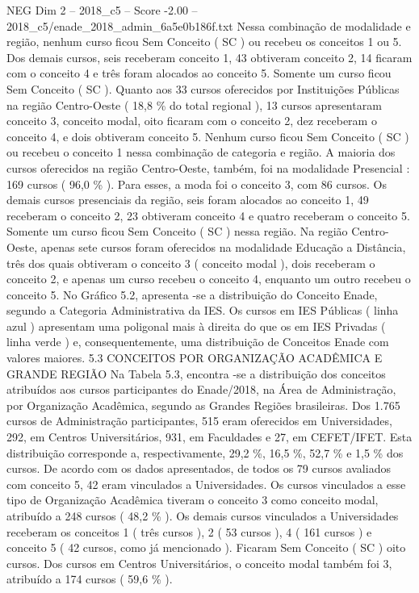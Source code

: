 \begin{textsample}{NEG Dim 2 – 2018\_c5 – Score -2.00 – 2018\_c5/enade\_2018\_admin\_6a5e0b186f.txt}
Nessa combinação de modalidade e região, nenhum curso ficou Sem Conceito ( SC ) ou recebeu os conceitos 1 ou 5.
Dos demais cursos, seis receberam conceito 1, 43 obtiveram conceito 2, 14 ficaram com o conceito 4 e três foram alocados ao conceito 5.
Somente um curso ficou Sem Conceito ( SC ).
Quanto aos 33 cursos oferecidos por Instituições Públicas na região Centro-Oeste ( 18,8 \% do total regional ), 13 cursos apresentaram conceito 3, conceito modal, oito ficaram com o conceito 2, dez receberam o conceito 4, e dois obtiveram conceito 5.
Nenhum curso ficou Sem Conceito ( SC ) ou recebeu o conceito 1 nessa combinação de categoria e região.
A maioria dos cursos oferecidos na região Centro-Oeste, também, foi na modalidade Presencial : 169 cursos ( 96,0 \% ).
Para esses, a moda foi o conceito 3, com 86 cursos.
Os demais cursos presenciais da região, seis foram alocados ao conceito 1, 49 receberam o conceito 2, 23 obtiveram conceito 4 e quatro receberam o conceito 5.
Somente um curso ficou Sem Conceito ( SC ) nessa região.
Na região Centro-Oeste, apenas sete cursos foram oferecidos na modalidade Educação a Distância, três dos quais obtiveram o conceito 3 ( conceito modal ), dois receberam o conceito 2, e apenas um curso recebeu o conceito 4, enquanto um outro recebeu o conceito 5.
No Gráfico 5.2, apresenta -se a distribuição do Conceito Enade, segundo a Categoria Administrativa da IES.
Os cursos em IES Públicas ( linha azul ) apresentam uma poligonal mais à direita do que os em IES Privadas ( linha verde ) e, consequentemente, uma distribuição de Conceitos Enade com valores maiores. 5.3 CONCEITOS POR ORGANIZAÇÃO ACADÊMICA E GRANDE REGIÃO Na Tabela 5.3, encontra -se a distribuição dos conceitos atribuídos aos cursos participantes do Enade/2018, na Área de Administração, por Organização Acadêmica, segundo as Grandes Regiões brasileiras.
Dos 1.765 cursos de Administração participantes, 515 eram oferecidos em Universidades, 292, em Centros Universitários, 931, em Faculdades e 27, em CEFET/IFET.
Esta distribuição corresponde a, respectivamente, 29,2 \%, 16,5 \%, 52,7 \% e 1,5 \% dos cursos.
De acordo com os dados apresentados, de todos os 79 cursos avaliados com conceito 5, 42 eram vinculados a Universidades.
Os cursos vinculados a esse tipo de Organização Acadêmica tiveram o conceito 3 como conceito modal, atribuído a 248 cursos ( 48,2 \% ).
Os demais cursos vinculados a Universidades receberam os conceitos 1 ( três cursos ), 2 ( 53 cursos ), 4 ( 161 cursos ) e conceito 5 ( 42 cursos, como já mencionado ).
Ficaram Sem Conceito ( SC ) oito cursos.
Dos cursos em Centros Universitários, o conceito modal também foi 3, atribuído a 174 cursos ( 59,6 \% ).

\end{textsample}
